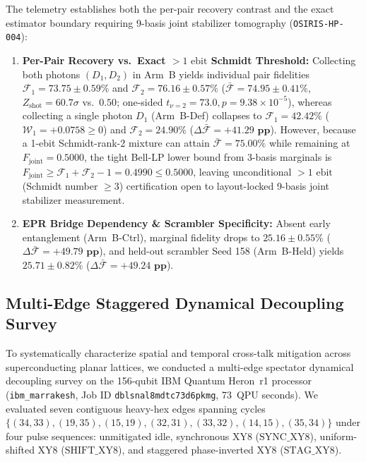 \documentclass[aps,preprint,superscriptaddress,longbibliography]{revtex4-2}
\begin{document}
The telemetry establishes both the per-pair recovery contrast and the exact estimator boundary requiring 9-basis joint stabilizer tomography (\texttt{OSIRIS-HP-004}):
\begin{enumerate}
\item \textbf{Per-Pair Recovery vs.\ Exact $>1\text{ ebit}$ Schmidt Threshold:} Collecting both photons $(D_1, D_2)$ in Arm~B yields individual pair fidelities $\mathcal{F}_1 = 73.75 \pm 0.59\%$ and $\mathcal{F}_2 = 76.16 \pm 0.57\%$ ($\bar{\mathcal{F}} = \mathbf{74.95 \pm 0.41\%}$, $Z_{\mathrm{shot}} = 60.7\sigma$ vs.\ $0.50$; one-sided $t_{\nu=2} = 73.0, p = 9.38 \times 10^{-5}$), whereas collecting a single photon $D_1$ (Arm~B-Def) collapses to $\mathcal{F}_1 = 42.42\%$ ($\mathcal{W}_1 = +0.0758 \ge 0$) and $\mathcal{F}_2 = 24.90\%$ ($\Delta \bar{\mathcal{F}} = \mathbf{+41.29\text{ pp}}$). However, because a 1-ebit Schmidt-rank-2 mixture can attain $\bar{\mathcal{F}} = 75.00\%$ while remaining at $F_{\mathrm{joint}} = 0.5000$, the tight Bell-LP lower bound from 3-basis marginals is $F_{\mathrm{joint}} \ge \mathcal{F}_1 + \mathcal{F}_2 - 1 = \mathbf{0.4990 \le 0.5000}$, leaving unconditional $>1\text{ ebit}$ (Schmidt number $\ge 3$) certification open to layout-locked 9-basis joint stabilizer measurement.
\item \textbf{EPR Bridge Dependency \& Scrambler Specificity:} Absent early entanglement (Arm~B-Ctrl), marginal fidelity drops to $25.16 \pm 0.55\%$ ($\Delta \bar{\mathcal{F}} = \mathbf{+49.79\text{ pp}}$), and held-out scrambler Seed 158 (Arm~B-Held) yields $25.71 \pm 0.82\%$ ($\Delta \bar{\mathcal{F}} = \mathbf{+49.24\text{ pp}}$).
\end{enumerate}

\subsection{Multi-Edge Staggered Dynamical Decoupling Survey}
\label{sec:dd_survey}

To systematically characterize spatial and temporal cross-talk mitigation across superconducting planar lattices, we conducted a multi-edge spectator dynamical decoupling survey on the 156-qubit IBM Quantum Heron~r1 processor (\texttt{ibm\_marrakesh}, Job ID \texttt{dblsnal8mdtc73d6pkmg}, 73~QPU seconds). We evaluated seven contiguous heavy-hex edges spanning cycles $\{ (34, 33), (19, 35), (15, 19), (32, 31), (33, 32), (14, 15), (35, 34) \}$ under four pulse sequences: unmitigated idle, synchronous XY8 ($\text{SYNC\_XY8}$), uniform-shifted XY8 ($\text{SHIFT\_XY8}$), and staggered phase-inverted XY8 ($\text{STAG\_XY8}$).
\end{document}

